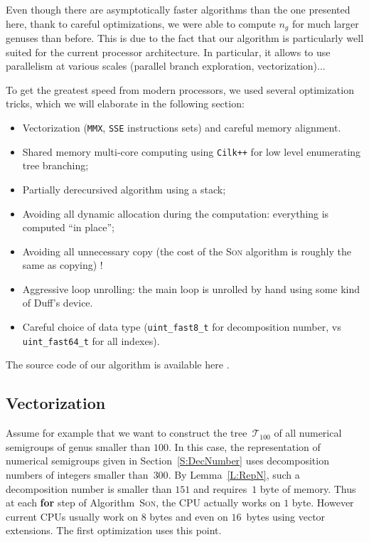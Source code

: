\documentclass[reqno]{amsart}
\theoremstyle{plain}
\theoremstyle{definition}
\newcommand{\CilkP}{\texttt{Cilk++}\xspace}
\newcommand{\MMX}{\texttt{MMX}\xspace}
\newcommand{\SSE}{\texttt{SSE}\xspace}
\begin{document}
Even though there are asymptotically faster algorithms than the one presented here,
thank to careful optimizations, we were able to compute $n_g$ for much larger
genuses than before. This is due to the fact that our algorithm is particularly
well suited for the current processor architecture. In particular, it allows
to use parallelism at various scales (parallel branch exploration,
vectorization)...

To get the greatest speed from modern processors, we used several optimization
tricks, which we will elaborate in the following section:


\begin{itemize}

\item Vectorization (\MMX, \SSE instructions sets) and careful memory alignment. 
\item Shared memory multi-core computing using \CilkP for low level
  enumerating tree branching;
\item Partially derecursived algorithm using a stack;
\item Avoiding all dynamic allocation during the computation: everything is
  computed ``in place'';
\item Avoiding all unnecessary copy (the cost of the \textsc{Son} algorithm is
  roughly the same as copying) !
\item Aggressive loop unrolling: the main loop is unrolled by hand using some
  kind of Duff's device.
\item Careful choice of data type (\verb|uint_fast8_t| for decomposition
  number, vs \verb|uint_fast64_t| for all indexes).
\end{itemize}

The source code of our algorithm is available here \cite{code}.
\subsection{Vectorization}

Assume for example that we want to construct the tree~$\mathcal{T}_{100}$
of all numerical semigroups of genus smaller than $100$.  In this case, the
representation of numerical semigroups given in Section~\ref{S:DecNumber} uses
decomposition numbers of integers smaller than~$300$.  By Lemma~\ref{L:RepN},
such a decomposition number is smaller than $151$ and requires~$1$ byte of
memory.  Thus at each \textbf{for} step of Algorithm~\textsc{Son}, the CPU
actually works on $1$ byte. However current CPUs usually work on $8$ bytes and
even on $16$~bytes using vector extensions. 
The first optimization uses this point. 
\end{document}
